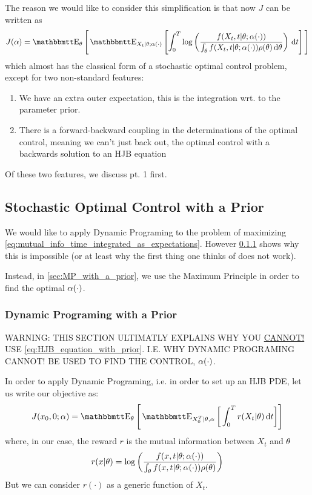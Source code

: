 \documentclass{article}
\begin{document}
The reason we would like to consider this simplification is that now
$J$ can be written as
\begin{equation}
J( \a) = \Exp_{\th} \Bigg[
\Exp_{X_t|\th; \a(\cdot)}
\left[ \int_0^T \log\left(\frac{f(X_t,t|\th; \a(\cdot))}
{\int_\th f(X_t,t|\th; \a(\cdot)) \rho(\th)\intd{\th}}\right) \intd{t} \right]
\Bigg] 
\label{eq:mutual_info_time_integrated_as_expectations}
\end{equation}
which almost has the classical form of a stochastic optimal control
problem, except for two non-standard features:
\begin{enumerate}
  \item We have an extra outer expectation, this is the integration wrt. to the
  parameter prior.
\item There is a forward-backward coupling in the determinations of the optimal
control, meaning we can't just back out, the optimal control with a backwards
solution to an HJB equation
\end{enumerate}
Of these two features, we discuss pt. 1 first.

\subsection{Stochastic Optimal Control with a Prior}
We would like to apply Dynamic Programing to the problem of maximizing
\cref{eq:mutual_info_time_integrated_as_expectations}. However
\cref{sec:DP_with_a_prior} shows why this is impossible (or at least why the
first thing one thinks of does not work).

Instead, in \cref{sec:MP_with_a_prior}, we use the Maximum Principle in order to
find the optimal ${\alpha}(\cdot)$.

\subsubsection{Dynamic Programing with a Prior}
\label{sec:DP_with_a_prior}

WARNING: THIS SECTION ULTIMATLY EXPLAINS WHY YOU \underline{CANNOT!} USE
\cref{eq:HJB_equation_with_prior}. I.E. WHY DYNAMIC PROGRAMING CANNOT! BE
USED TO FIND THE CONTROL, ${\alpha}(\cdot)$. 

\vskip 15pt

In order to apply Dynamic Programing, i.e. in order to set up an HJB PDE, let us
write our objective as:
\begin{equation}
J(x_0, 0; \a) = \Exp_\th \Bigg[ \Exp_{X_0^T|\th, \a} \bigg[ \int_0^T r(X_t|
\th)\intd{t} \bigg]\Bigg]
\label{eq:stochastic_objective_with_prior_generic} 
\end{equation}
where, in our case, the reward $r$ is the mutual information between $X_t$ and
${\theta}$ 
\begin{equation}
r(x|{\theta}) = \log\left(\frac{f(x,t|{\theta}; {\alpha}(\cdot))}
{\int_{\theta} f(x,t|{\theta}; {\alpha}(\cdot)) \rho({\theta})}\right)
\label{eq:reward_funciont_mutual_information}
\end{equation}
But we can consider $r(\cdot)$ as a generic function of $X_t$.
\end{document}

